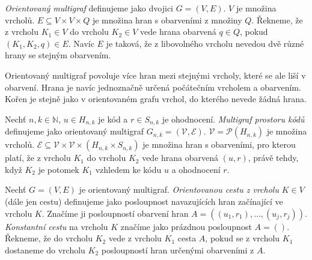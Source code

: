 \begin{definice}
    \emph{Orientovaný multigraf} definujeme jako dvojici $G = (V,E)$. $V$ je množina vrcholů. $E \subseteq V \times V \times Q$ je množina hran s obarveními z množiny $Q$. Řekneme, že z vrcholu $K_1 \in V$ do vrcholu $K_2 \in V$ vede hrana obarvená $q \in Q$, pokud $(K_1, K_2, q) \in E$. Navíc $E$ je taková, že z libovolného vrcholu nevedou dvě různé hrany se stejným obarvením.
\end{definice}
\begin{pozn}
    Orientovaný multigraf povoluje více hran mezi stejnými vrcholy, které se ale liší v obarvení. Hrana je navíc jednoznačně určená počátečním vrcholem a obarvením. Kořen je stejně jako v orientovaném grafu vrchol, do kterého nevede žádná hrana. 
\end{pozn}
\begin{definice}
  Nechť $n, k\in \mathbb{N}$, $u\in H_{n,k}$ je kód a $r\in S_{n,k}$ je ohodnocení. \emph{Multigraf prostoru kódů} definujeme jako orientovaný multigraf $G_{n,k} = (\mathcal{V}, \mathcal{E})$. $\mathcal{V} = \mathcal{P}(H_{n,k})$ je množina vrcholů. $\mathcal{E} \subseteq \mathcal{V} \times \mathcal{V} \times (H_{n,k}\times S_{n,k})$ je množina hran s obarveními, pro kterou platí, že z vrcholu $K_1$ do vrcholu $K_2$ vede hrana obarvená $(u,r)$, právě tehdy, když $K_2$ je potomek $K_1$ vzhledem ke kódu $u$ a ohodnocení $r$. 
\end{definice}

\begin{definice}
    Nechť $G = (V, E)$ je orientovaný multigraf. \emph{Orientovanou cestu z vrcholu} $K \in V$ (dále jen cestu) definujeme jako posloupnost navazujících hran začínající ve vrcholu $K$. Značíme ji posloupností obarvení hran $A = ((u_1,r_1), \dots, (u_j, r_j))$. \emph{Konstantní cestu} na vrcholu $K$ značíme jako prázdnou posloupnost $A = ()$. Řekneme, že do vrcholu $K_2$ vede z vrcholu $K_1$ cesta $A$, pokud se z vrcholu $K_1$ dostaneme do vrcholu $K_2$ posloupností hran určenými obarveními z $A$. 
\end{definice}

